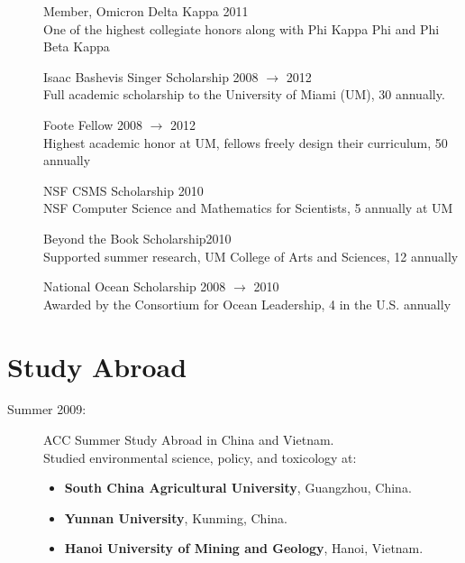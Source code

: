 \documentclass[margin,line]{resume}
\begin{document}
\begin{resume}
\begin{description}
    \item[] \normalsize Member, Omicron Delta Kappa \hfill 2011 \\
    One of the highest collegiate honors along with Phi Kappa Phi and Phi Beta Kappa 

    \item[] \normalsize Isaac Bashevis Singer Scholarship \hfill 2008 $\rightarrow$ 2012 \\
    Full academic scholarship to the University of Miami (UM), 30 annually.
    
    \item[] \normalsize Foote Fellow \hfill 2008 $\rightarrow$ 2012 \\
    Highest academic honor at UM, fellows freely design their curriculum, 50 annually

    \item[] \normalsize NSF CSMS Scholarship \hfill 2010 \\
    NSF Computer Science and Mathematics for Scientists, 5 annually at UM
     
    \item[] Beyond the Book Scholarship\hfill \normalsize 2010  \\ 
    Supported summer research, UM College of Arts and Sciences, 12 annually

    \item[] \normalsize National Ocean Scholarship \hfill 2008 $\rightarrow$ 2010 \\ 
    Awarded by the Consortium for Ocean Leadership, 4 in the U.S. annually

\end{description} 





\vspace{-5mm}
\section{\mysidestyle Study Abroad}
\begin{description}
    \item[Summer 2009:] ACC Summer Study Abroad in China and Vietnam. \\ Studied environmental science, policy, and toxicology at:
    \begin{itemize}
        \item \textbf{South China Agricultural University}, Guangzhou, China.
        \item \textbf{Yunnan University}, Kunming, China.
        \item \textbf{Hanoi University of Mining and Geology}, Hanoi, Vietnam.
    \end{itemize}
\end{description}





\end{resume}
\end{document}
